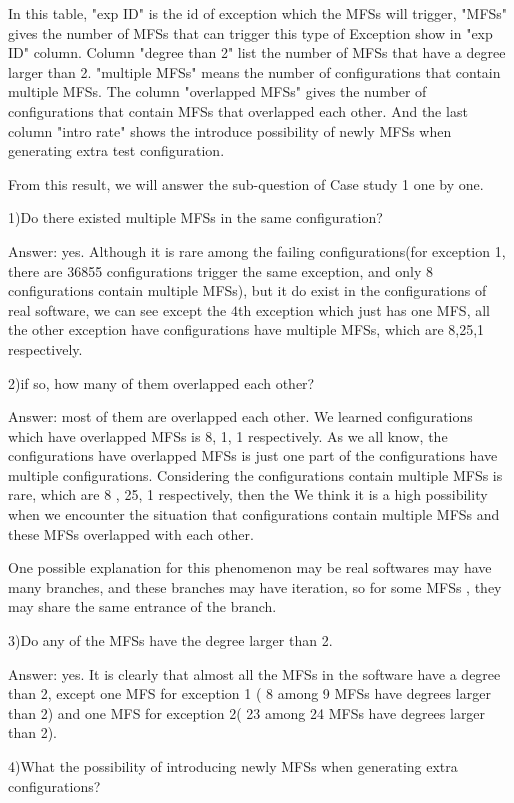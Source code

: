 \documentclass[10pt,journal,cspaper,compsoc]{IEEEtran}
\begin{document}
In this table,  "exp ID" is the id of exception which the MFSs will trigger, "MFSs" gives the number of MFSs that can trigger this type of Exception show in "exp ID" column. Column "degree than 2" list the number of MFSs that have a degree larger than 2.  "multiple MFSs" means the number of configurations that contain multiple MFSs. The column "overlapped MFSs" gives the number of configurations that contain MFSs that overlapped each other. And the last column "intro rate" shows the introduce possibility of newly MFSs when generating extra test configuration.

From this result, we will answer the sub-question of Case study 1 one by one.

1)Do there existed multiple MFSs in the same configuration?

Answer: yes. Although it is rare among the failing configurations(for exception 1, there are 36855 configurations trigger the same exception, and only 8 configurations contain multiple MFSs), but it do exist in the configurations of real software, we can see except the $4$th exception which just has one MFS, all the other exception have configurations have multiple MFSs, which are 8,25,1 respectively.

2)if so, how many of them overlapped each other?

Answer: most of them are overlapped each other. We learned configurations which have overlapped MFSs is 8, 1, 1 respectively. As we all know, the configurations have overlapped MFSs is just one part of the configurations have multiple configurations. Considering the configurations contain multiple MFSs is rare, which are 8 , 25, 1 respectively, then the  We think it is a high possibility when we encounter the situation that configurations contain multiple MFSs and these MFSs overlapped with each other.

One possible explanation for this phenomenon may be real softwares may have many branches, and these branches may have iteration, so for some MFSs , they may share the same entrance of the branch.

3)Do any of the MFSs have the degree larger than 2.

Answer: yes.  It is clearly that almost all the MFSs in the software have a degree than 2, except one MFS for exception 1 ( 8 among 9 MFSs have degrees larger than 2) and one MFS for exception 2( 23 among 24 MFSs have degrees larger than 2).

4)What the possibility of introducing newly MFSs when generating extra configurations?
\end{document}

